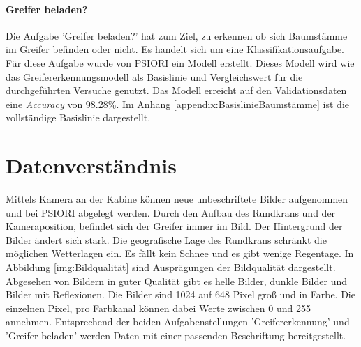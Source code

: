 	\paragraph{Greifer beladen?} Die Aufgabe 'Greifer beladen?' hat zum Ziel, zu erkennen ob sich Baumstämme im Greifer befinden oder nicht. Es handelt sich um eine Klassifikationsaufgabe. Für diese Aufgabe wurde von PSIORI ein Modell erstellt. Dieses Modell wird wie das Greifererkennungsmodell als Basislinie und Vergleichswert für die durchgeführten Versuche genutzt. Das Modell erreicht auf den Validationsdaten eine \textit{Accuracy} von 98.28\%. Im Anhang \ref{appendix:BasislinieBaumstämme} ist die vollständige Basislinie dargestellt. 

	\section{Datenverständnis}
	\label{sec:DataUnderstanding}
	Mittels Kamera an der Kabine können neue unbeschriftete Bilder aufgenommen und bei PSIORI abgelegt werden. Durch den Aufbau des Rundkrans und der Kameraposition, befindet sich der Greifer immer im Bild. Der Hintergrund der Bilder ändert sich stark. Die geografische Lage des Rundkrans schränkt die möglichen Wetterlagen ein. Es fällt kein Schnee und es gibt wenige Regentage. In Abbildung  \ref{img:Bildqualität} sind Ausprägungen der Bildqualität dargestellt. Abgesehen von Bildern in guter Qualität gibt es helle Bilder, dunkle Bilder und Bilder mit Reflexionen. Die Bilder sind 1024 auf 648 Pixel groß und in Farbe. Die einzelnen Pixel, pro Farbkanal können dabei Werte zwischen 0 und 255 annehmen. 
	Entsprechend der beiden Aufgabenstellungen 'Greifererkennung' und 'Greifer beladen' werden Daten mit einer passenden Beschriftung bereitgestellt.	
